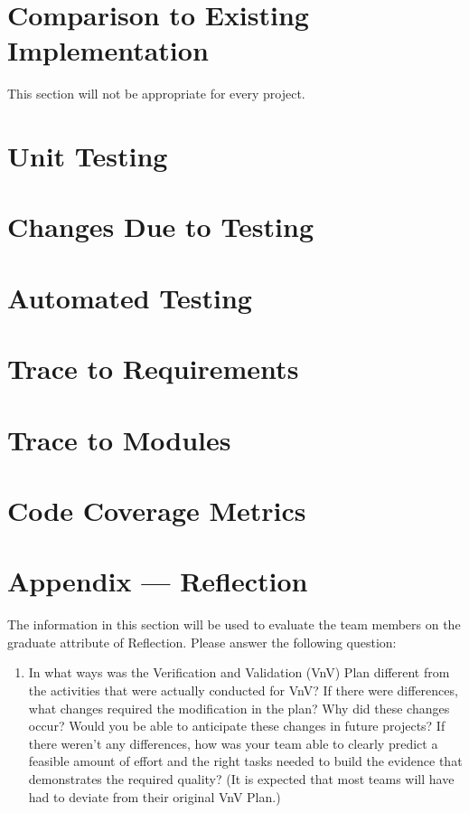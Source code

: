 \documentclass[12pt, titlepage]{article}
\begin{document}
	
\section{Comparison to Existing Implementation}	

This section will not be appropriate for every project.

\section{Unit Testing}

\section{Changes Due to Testing}


\section{Automated Testing}
		
\section{Trace to Requirements}
		
\section{Trace to Modules}		

\section{Code Coverage Metrics}




\newpage{}
\section*{Appendix --- Reflection}

The information in this section will be used to evaluate the team members on the
graduate attribute of Reflection.  Please answer the following question:

\begin{enumerate}
  \item In what ways was the Verification and Validation (VnV) Plan different
  from the activities that were actually conducted for VnV?  If there were
  differences, what changes required the modification in the plan?  Why did
  these changes occur?  Would you be able to anticipate these changes in future
  projects?  If there weren't any differences, how was your team able to clearly
  predict a feasible amount of effort and the right tasks needed to build the
  evidence that demonstrates the required quality?  (It is expected that most
  teams will have had to deviate from their original VnV Plan.)
\end{enumerate}
\end{document}
